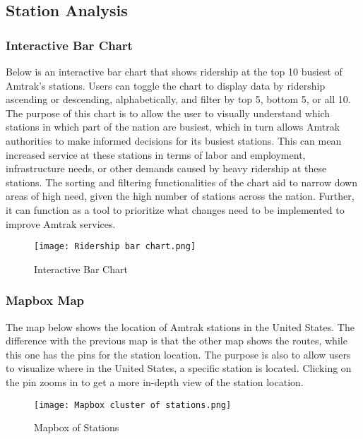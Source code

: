 \documentclass[runningheads]{llncs}
\begin{document}
\subsection{Station Analysis}
\subsubsection{Interactive Bar Chart}
Below is an interactive bar chart that shows ridership at the top 10 busiest of Amtrak’s stations. Users can toggle the chart to display data by ridership ascending or descending, alphabetically, and filter by top 5, bottom 5, or all 10. The purpose of this chart is to allow the user to visually understand which stations in which part of the nation are busiest, which in turn allows Amtrak authorities to make informed decisions for its busiest stations. This can mean increased service at these stations in terms of labor and employment, infrastructure needs, or other demands caused by heavy ridership at these stations. The sorting and filtering functionalities of the chart aid to narrow down areas of high need, given the high number of stations across the nation. Further, it can function as a tool to prioritize what changes need to be implemented to improve Amtrak services.
\begin{figure}
    \centering
    \texttt{[image: Ridership bar chart.png]}
    \caption{Interactive Bar Chart}
    \label{fig:3}
\end{figure}

\subsubsection{Mapbox Map}
The map below shows the location of Amtrak stations in the United States. The difference with the previous map is that the other map shows the routes, while this one has the pins for the station location. The purpose is also to allow users to visualize where in the United States, a specific station is located. Clicking on the pin zooms in to get a more in-depth view of the station location.
\begin{figure}
    \centering
    \texttt{[image: Mapbox cluster of stations.png]}
    \caption{Mapbox of Stations}
    \label{fig:4}
\end{figure}
\end{document}
